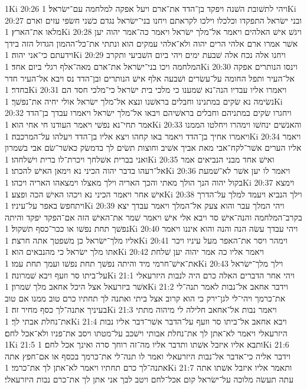 1Ki 20:26  ויהי לתשׁובת השׁנה ויפקד בן־הדד את־ארם ויעל אפקה למלחמה עם־ישׂראל׃
1Ki 20:27  ובני ישׂראל התפקדו וכלכלו וילכו לקראתם ויחנו בני־ישׂראל נגדם כשׁני חשׂפי עזים וארם מלאו את־הארץ׃
1Ki 20:28  ויגשׁ אישׁ האלהים ויאמר אל־מלך ישׂראל ויאמר כה־אמר יהוה יען אשׁר אמרו ארם אלהי הרים יהוה ולא־אלהי עמקים הוא ונתתי את־כל־ההמון הגדול הזה בידך וידעתם כי־אני יהוה׃
1Ki 20:29  ויחנו אלה נכח אלה שׁבעת ימים ויהי ביום השׁביעי ותקרב המלחמה ויכו בני־ישׂראל את־ארם מאה־אלף רגלי ביום אחד׃
1Ki 20:30  וינסו הנותרים אפקה אל־העיר ותפל החומה על־עשׂרים ושׁבעה אלף אישׁ הנותרים ובן־הדד נס ויבא אל־העיר חדר בחדר׃
1Ki 20:31  ויאמרו אליו עבדיו הנה־נא שׁמענו כי מלכי בית ישׂראל כי־מלכי חסד הם נשׂימה נא שׂקים במתנינו וחבלים בראשׁנו ונצא אל־מלך ישׂראל אולי יחיה את־נפשׁך׃
1Ki 20:32  ויחגרו שׂקים במתניהם וחבלים בראשׁיהם ויבאו אל־מלך ישׂראל ויאמרו עבדך בן־הדד אמר תחי־נא נפשׁי ויאמר העודנו חי אחי הוא׃
1Ki 20:33  והאנשׁים ינחשׁו וימהרו ויחלטו הממנו ויאמרו אחיך בן־הדד ויאמר באו קחהו ויצא אליו בן־הדד ויעלהו על־המרכבה׃
1Ki 20:34  ויאמר אליו הערים אשׁר־לקח־אבי מאת אביך אשׁיב וחוצות תשׂים לך בדמשׂק כאשׁר־שׂם אבי בשׁמרון ואני בברית אשׁלחך ויכרת־לו ברית וישׁלחהו׃
1Ki 20:35  ואישׁ אחד מבני הנביאים אמר אל־רעהו בדבר יהוה הכיני נא וימאן האישׁ להכתו׃
1Ki 20:36  ויאמר לו יען אשׁר לא־שׁמעת בקול יהוה הנך הולך מאתי והכך האריה וילך מאצלו וימצאהו האריה ויכהו׃
1Ki 20:37  וימצא אישׁ אחר ויאמר הכיני נא ויכהו האישׁ הכה ופצע׃
1Ki 20:38  וילך הנביא ויעמד למלך על־הדרך ויתחפשׂ באפר על־עיניו׃
1Ki 20:39  ויהי המלך עבר והוא צעק אל־המלך ויאמר עבדך יצא בקרב־המלחמה והנה־אישׁ סר ויבא אלי אישׁ ויאמר שׁמר את־האישׁ הזה אם־הפקד יפקד והיתה נפשׁך תחת נפשׁו או ככר־כסף תשׁקול׃
1Ki 20:40  ויהי עבדך עשׂה הנה והנה והוא איננו ויאמר אליו מלך־ישׂראל כן משׁפטך אתה חרצת׃
1Ki 20:41  וימהר ויסר את־האפר מעל עיניו ויכר אתו מלך ישׂראל כי מהנבאים הוא׃
1Ki 20:42  ויאמר אליו כה אמר יהוה יען שׁלחת את־אישׁ־חרמי מיד והיתה נפשׁך תחת נפשׁו ועמך תחת עמו׃
1Ki 20:43  וילך מלך־ישׂראל על־ביתו סר וזעף ויבא שׁמרונה׃
1Ki 21:1  ויהי אחר הדברים האלה כרם היה לנבות היזרעאלי אשׁר ביזרעאל אצל היכל אחאב מלך שׁמרון׃
1Ki 21:2  וידבר אחאב אל־נבות לאמר תנה־לי את־כרמך ויהי־לי לגן־ירק כי הוא קרוב אצל ביתי ואתנה לך תחתיו כרם טוב ממנו אם טוב בעיניך אתנה־לך כסף מחיר זה׃
1Ki 21:3  ויאמר נבות אל־אחאב חלילה לי מיהוה מתתי את־נחלת אבתי לך׃
1Ki 21:4  ויבא אחאב אל־ביתו סר וזעף על־הדבר אשׁר־דבר אליו נבות היזרעאלי ויאמר לא־אתן לך את־נחלת אבותי וישׁכב על־מטתו ויסב את־פניו ולא־אכל לחם׃
1Ki 21:5  ותבא אליו איזבל אשׁתו ותדבר אליו מה־זה רוחך סרה ואינך אכל לחם׃
1Ki 21:6  וידבר אליה כי־אדבר אל־נבות היזרעאלי ואמר לו תנה־לי את־כרמך בכסף או אם־חפץ אתה אתנה־לך כרם תחתיו ויאמר לא־אתן לך את־כרמי׃
1Ki 21:7  ותאמר אליו איזבל אשׁתו אתה עתה תעשׂה מלוכה על־ישׂראל קום אכל־לחם ויטב לבך אני אתן לך את־כרם נבות היזרעאלי׃
